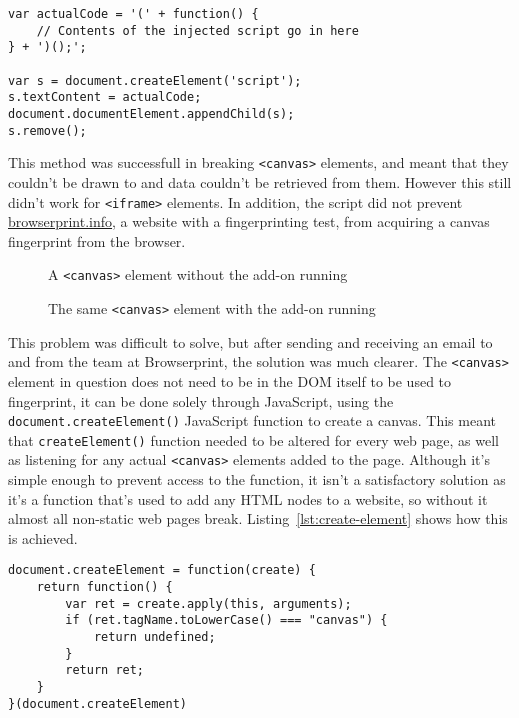 \begin{lstlisting}[caption={Injecting a script into the web page}, label={lst:injection}]
var actualCode = '(' + function() {
    // Contents of the injected script go in here
} + ')();';

var s = document.createElement('script');
s.textContent = actualCode;
document.documentElement.appendChild(s);
s.remove();
\end{lstlisting}

This method was successfull in breaking \texttt{<canvas>} elements, and meant that they couldn't be drawn to and data couldn't be retrieved from them.
However this still didn't work for \texttt{<iframe>} elements.
In addition, the script did not prevent \url{browserprint.info}, a website with a fingerprinting test, from acquiring a canvas fingerprint from the browser.

\begin{figure}[!tbp]
    \centering
    \begin{minipage}[b]{0.4\textwidth}
        \caption{A \texttt{<canvas>} element without the add-on running}
        \label{fig:hello-world-canvas}
    \end{minipage}
    \hfill
    \begin{minipage}[b]{0.4\textwidth}
        \caption{The same \texttt{<canvas>} element with the add-on running}
        \label{fig:blank-canvas}
    \end{minipage}
\end{figure}

This problem was difficult to solve, but after sending and receiving an email to and from the team at Browserprint, the solution was much clearer.
The \texttt{<canvas>} element in question does not need to be in the DOM itself to be used to fingerprint, it can be done solely through JavaScript, using the \texttt{document.createElement()} JavaScript function to create a canvas.
This meant that \texttt{createElement()} function needed to be altered for every web page, as well as listening for any actual \texttt{<canvas>} elements added to the page.
Although it's simple enough to prevent access to the function, it isn't a satisfactory solution as it's a function that's used to add any HTML nodes to a website, so without it almost all non-static web pages break.
Listing~\ref{lst:create-element} shows how this is achieved.

\begin{lstlisting}[caption={The rewriting of the \texttt{createElement() function}}, label={lst:create-element}]
document.createElement = function(create) {
    return function() {
        var ret = create.apply(this, arguments);
        if (ret.tagName.toLowerCase() === "canvas") {
            return undefined;
        }
        return ret;
    }
}(document.createElement)
\end{lstlisting}

